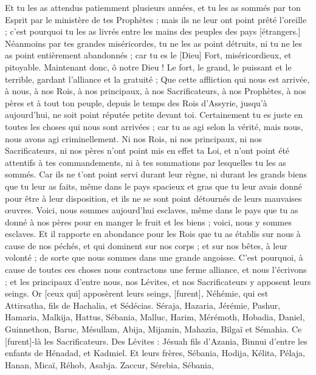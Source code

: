 \begin{multicols}{2}
{Et tu les as attendus patiemment plusieurs années, et tu les as sommés par ton Esprit par le ministère de tes Prophètes ; mais ils ne leur ont point prêté l'oreille ; c'est pourquoi tu les as livrés entre les mains des peuples des pays [étrangers.]
Néanmoins par tes grandes miséricordes, tu ne les as point détruits, ni tu ne les as point entièrement abandonnés ; car tu es le [Dieu] Fort, miséricordieux, et pitoyable.
Maintenant donc, ô notre Dieu ! Le fort, le grand, le puissant et le terrible, gardant l'alliance et la gratuité ; Que cette affliction qui nous est arrivée, à nous, à nos Rois, à nos principaux, à nos Sacrificateurs, à nos Prophètes, à nos pères et à tout ton peuple, depuis le temps des Rois d'Assyrie, jusqu'à aujourd'hui, ne soit point réputée petite devant toi.
Certainement tu es juste en toutes les choses qui nous sont arrivées ; car tu as agi selon la vérité, mais nous, nous avons agi criminellement.
Ni nos Rois, ni nos principaux, ni nos Sacrificateurs, ni nos pères n'ont point mis en effet ta Loi, et n'ont point été attentifs à tes commandements, ni à tes sommations par lesquelles tu les as sommés.
Car ils ne t'ont point servi durant leur règne, ni durant les grands biens que tu leur as faits, même dans le pays spacieux et gras que tu leur avais donné pour être à leur disposition, et ils ne se sont point détournés de leurs mauvaises œuvres.
Voici, nous sommes aujourd'hui esclaves, même dans le pays que tu as donné à nos pères pour en manger le fruit et les biens ; voici, nous y sommes esclaves.
Et il rapporte en abondance pour les Rois que tu as établis sur nous à cause de nos péchés, et qui dominent sur nos corps ; et sur nos bêtes, à leur volonté ; de sorte que nous sommes dans une grande angoisse.
C'est pourquoi, à cause de toutes ces choses nous contractons une ferme alliance, et nous l'écrivons ; et les principaux d'entre nous, nos Lévites, et nos Sacrificateurs y apposent leurs seings.
\VerseOne{}Or [ceux qui] apposèrent leurs seings, [furent], Néhémie, qui est Attirsatha, fils de Hachalia, et Sédécias.
Séraja, Hazaria, Jérémie,
Pashur, Hamaria, Malkija,
Hattus, Sébania, Malluc,
Harim, Mérémoth, Hobadia,
Daniel, Guinnethon, Baruc,
Mésullam, Abija, Mijamin,
Mahazia, Bilgaï et Sémahia. Ce [furent]-là les Sacrificateurs.
Des Lévites : Jésuah fils d'Azania, Binnui d'entre les enfants de Hénadad, et Kadmiel.
Et leurs frères, Sébania, Hodija, Kélita, Pélaja, Hanan,
Micaï, Réhob, Asabja.
Zaccur, Sérebia, Sébania,
}
\end{multicols}
